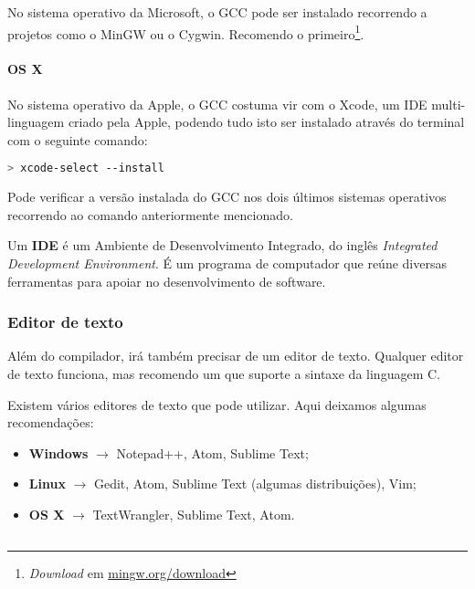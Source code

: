 No sistema operativo da Microsoft, o GCC pode ser instalado recorrendo a projetos como o MinGW ou o Cygwin. Recomendo o primeiro\footnote{\textit{Download} em \color{links}\href{http://www.mingw.org/download/installer?}{mingw.org/download}}.

\paragraph{OS X}

No sistema operativo da Apple, o GCC costuma vir com o Xcode, um IDE multi-linguagem criado pela Apple, podendo tudo isto ser instalado através do terminal com o seguinte comando:

\begin{lstlisting}[language=bash,numbers=none]
> xcode-select --install
\end{lstlisting}

Pode verificar a versão instalada do GCC nos dois últimos sistemas operativos recorrendo ao comando anteriormente mencionado.

\begin{mdframed}[backgroundcolor=cinzaclaro, linewidth=0pt]
Um \textbf{IDE} é um Ambiente de Desenvolvimento Integrado, do inglês \textit{Integrated
Development Environment}. É um programa de computador que reúne diversas ferramentas
para apoiar no desenvolvimento de software.
\end{mdframed}

\subsubsection{Editor de texto}

Além do compilador, irá também precisar de um editor de texto. Qualquer editor de texto funciona, mas recomendo um que suporte a sintaxe da linguagem C.

Existem vários editores de texto que pode utilizar. Aqui deixamos algumas recomendações:

\begin{itemize}
\item \textbf{Windows} \(\rightarrow\) Notepad++, Atom, Sublime Text;
\item \textbf{Linux} \(\rightarrow\) Gedit, Atom, Sublime Text (algumas distribuições), Vim;
\item \textbf{OS X} \(\rightarrow\) TextWrangler, Sublime Text, Atom.
\end{itemize}

\subsection{}


